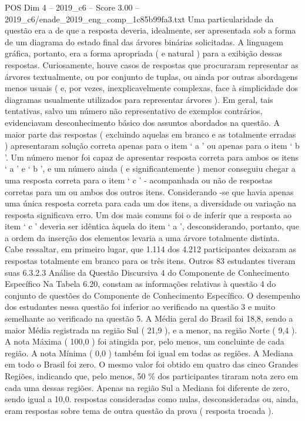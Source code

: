 \begin{textsample}{POS Dim 4 – 2019\_c6 – Score 3.00 – 2019\_c6/enade\_2019\_eng\_comp\_1c85b99fa3.txt}
Uma particularidade da questão era a de que a resposta deveria, idealmente, ser apresentada sob a forma de um diagrama do estado final das árvores binárias solicitadas.
A linguagem gráfica, portanto, era a forma apropriada ( e natural ) para a exibição dessas respostas.
Curiosamente, houve casos de respostas que procuraram representar as árvores textualmente, ou por conjunto de tuplas, ou ainda por outras abordagens menos usuais ( e, por vezes, inexplicavelmente complexas, face à simplicidade dos diagramas usualmente utilizados para representar árvores ).
Em geral, tais tentativas, salvo um número não representativo de exemplos contrários, evidenciavam desconhecimento básico dos assuntos abordados na questão.
A maior parte das respostas ( excluindo aquelas em branco e as totalmente erradas ) apresentaram solução correta apenas para o item ‘ a ’ ou apenas para o item ‘ b ’.
Um número menor foi capaz de apresentar resposta correta para ambos os itens ‘ a ’ e ‘ b ’, e um número ainda ( e significantemente ) menor conseguiu chegar a uma resposta correta para o item ‘ c ’ - acompanhada ou não de respostas corretas para um ou ambos dos outros itens.
Considerando -se que havia apenas uma única resposta correta para cada um dos itens, a diversidade ou variação na resposta significava erro.
Um dos mais comuns foi o de inferir que a resposta ao item ‘ c ’ deveria ser idêntica àquela do item ‘ a ’, desconsiderando, portanto, que a ordem da inserção dos elementos levaria a uma árvore totalmente distinta.
Cabe ressaltar, em primeiro lugar, que 1.114 dos 4.212 participantes deixaram as respostas totalmente em branco para os três itens.
Outros 83 estudantes tiveram suas 6.3.2.3 Análise da Questão Discursiva 4 do Componente de Conhecimento Específico Na Tabela 6.20, constam as informações relativas à questão 4 do conjunto de questões do Componente de Conhecimento Específico.
O desempenho dos estudantes nessa questão foi inferior ao verificado na questão 3 e muito semelhante ao verificado na questão 5.
A Média geral do Brasil foi 18,8, sendo a maior Média registrada na região Sul ( 21,9 ), e a menor, na região Norte ( 9,4 ).
A nota Máxima ( 100,0 ) foi atingida por, pelo menos, um concluinte de cada região.
A nota Mínima ( 0,0 ) também foi igual em todas as regiões.
A Mediana em todo o Brasil foi zero.
O mesmo valor foi obtido em quatro das cinco Grandes Regiões, indicando que, pelo menos, 50 \% dos participantes tiraram nota zero em cada uma dessas regiões.
Apenas na região Sul a Mediana foi diferente de zero, sendo igual a 10,0. respostas consideradas como nulas, desconsideradas ou, ainda, eram respostas sobre tema de outra questão da prova ( resposta trocada ).

\end{textsample}
